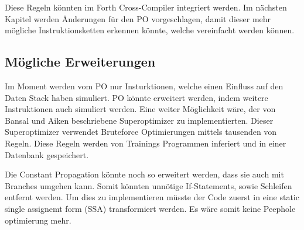 Diese Regeln könnten im Forth Cross-Compiler integriert werden. Im nächsten Kapitel werden Änderungen für den PO vorgeschlagen, damit dieser mehr mögliche Instruktionsketten erkennen könnte, welche vereinfacht werden können.

\subsection{Mögliche Erweiterungen}

Im Moment werden vom PO nur Insturktionen, welche einen Einfluss auf den Daten Stack haben simuliert. PO könnte erweitert werden, indem weitere Instruktionen auch simuliert werden. Eine weiter Möglichkeit wäre, der von Bansal und Aiken beschriebene Superoptimizer zu implementierten. Dieser Superoptimizer verwendet Bruteforce Optimierungen mittels tausenden von Regeln. Diese Regeln werden von Trainings Programmen inferiert und in einer Datenbank gespeichert.\cite{superoptimizer}

Die Constant Propagation könnte noch so erweitert werden, dass sie auch mit Branches umgehen kann. Somit könnten unnötige If-Statements, sowie Schleifen entfernt werden. Um dies zu implementieren müsste der Code zuerst in eine static single assignemt form (SSA) transformiert werden.\cite{ssa} Es wäre somit keine Peephole optimierung mehr.